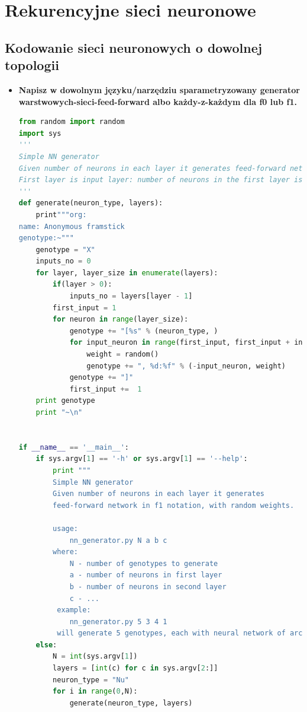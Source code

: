 
\section{Rekurencyjne sieci neuronowe}

\subsection{ Kodowanie sieci neuronowych o dowolnej topologii}

\begin{itemize}
\item \textbf{
Napisz w dowolnym języku/narzędziu sparametryzowany generator warstwowych-sieci-feed-forward albo każdy-z-każdym dla f0 lub f1.}	

\begin{lstlisting}[language=python]
from random import random
import sys
'''
Simple NN generator 
Given number of neurons in each layer it generates feed-forward network in f1 notation, with random weights.
First layer is input layer: number of neurons in the first layer is equal to number of inputs of the network.
'''
def generate(neuron_type, layers):        
    print"""org:
name: Anonymous framstick
genotype:~"""
    genotype = "X"
    inputs_no = 0  
    for layer, layer_size in enumerate(layers):
        if(layer > 0):
            inputs_no = layers[layer - 1]
        first_input = 1
        for neuron in range(layer_size):
            genotype += "[%s" % (neuron_type, )
            for input_neuron in range(first_input, first_input + inputs_no):
                weight = random()
                genotype += ", %d:%f" % (-input_neuron, weight)
            genotype += "]"
            first_input +=  1
    print genotype
    print "~\n"
            

if __name__ == '__main__':
    if sys.argv[1] == '-h' or sys.argv[1] == '--help':
        print """
        Simple NN generator 
        Given number of neurons in each layer it generates
        feed-forward network in f1 notation, with random weights.
        
        usage:
            nn_generator.py N a b c
        where:
            N - number of genotypes to generate
            a - number of neurons in first layer
            b - number of neurons in second layer
            c - ...
         example:
            nn_generator.py 5 3 4 1
         will generate 5 genotypes, each with neural network of architecture 3-4-3."""
    else:
        N = int(sys.argv[1])
        layers = [int(c) for c in sys.argv[2:]]
        neuron_type = "Nu"
        for i in range(0,N):
            generate(neuron_type, layers)
\end{lstlisting}

\end{itemize}


